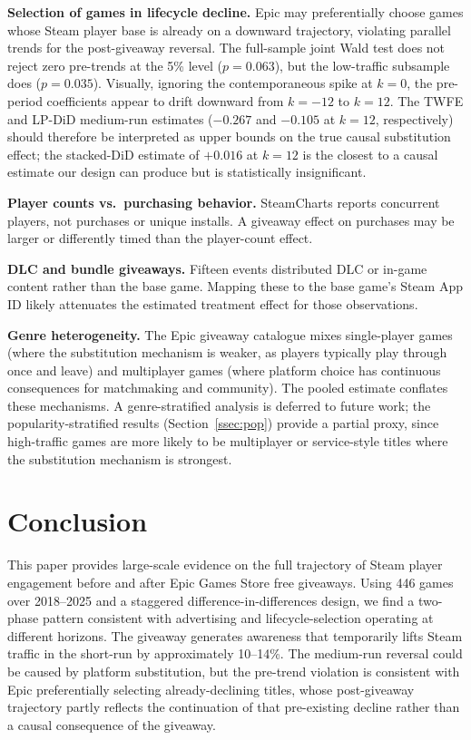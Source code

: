 \documentclass[11pt]{article}
\begin{document}
\textbf{Selection of games in lifecycle decline.} Epic may preferentially choose
games whose Steam player base is already on a downward trajectory, violating
parallel trends for the post-giveaway reversal. The full-sample joint Wald test
does not reject zero pre-trends at the 5\% level ($p = 0.063$), but the
low-traffic subsample does ($p = 0.035$). Visually, ignoring the contemporaneous spike 
at $k = 0$, the pre-period coefficients appear to drift downward from $k = -12$ to $k = 12$.
The TWFE and LP-DiD medium-run estimates ($-0.267$ and $-0.105$ at $k = 12$,
respectively) should therefore be interpreted as upper bounds on the true causal
substitution effect; the stacked-DiD estimate of $+0.016$ at $k = 12$ is the
closest to a causal estimate our design can produce but is statistically
insignificant.

\textbf{Player counts vs.\ purchasing behavior.} SteamCharts reports concurrent
players, not purchases or unique installs. A giveaway effect on purchases may be
larger or differently timed than the player-count effect.

\textbf{DLC and bundle giveaways.} Fifteen events distributed DLC or in-game content
rather than the base game. Mapping these to the base game's Steam App ID likely
attenuates the estimated treatment effect for those observations.

\textbf{Genre heterogeneity.} The Epic giveaway catalogue mixes single-player games
(where the substitution mechanism is weaker, as players typically play through once and
leave) and multiplayer games (where platform choice has continuous consequences for
matchmaking and community). The pooled estimate conflates these mechanisms.
A genre-stratified analysis is deferred to future work; the popularity-stratified
results (Section~\ref{ssec:pop}) provide a partial proxy, since high-traffic games
are more likely to be multiplayer or service-style titles where the substitution
mechanism is strongest.

\section{Conclusion}
\label{sec:conclusion}

This paper provides large-scale evidence on the full trajectory of
Steam player engagement before and after Epic Games Store free giveaways. Using 446
games over 2018--2025 and a staggered difference-in-differences design, we find
a two-phase pattern consistent with advertising and lifecycle-selection operating at different horizons. 
The giveaway generates awareness that temporarily lifts Steam traffic in the short-run by
approximately 10--14\%. The medium-run reversal could be caused by platform substitution, but the 
pre-trend violation is consistent with Epic preferentially selecting already-declining titles, 
whose post-giveaway trajectory partly reflects the continuation of that pre-existing decline 
rather than a causal consequence of the giveaway.
\end{document}
